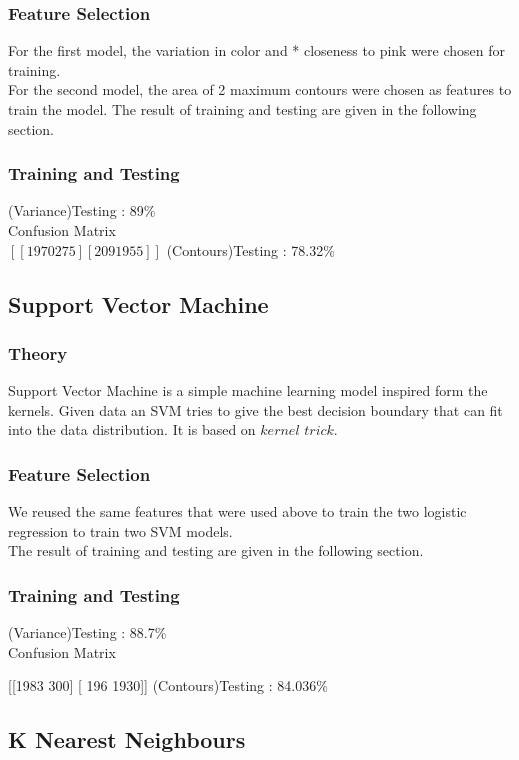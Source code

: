 \documentclass{scrreprt}
\begin{document}
\subsubsection{Feature Selection}
For the first model, the variation in color and * closeness to pink were chosen for training. \\
For the second model, the area of 2 maximum contours were chosen as features to train the model. 
The result of training and testing are given in the following section.

\subsubsection{Training and Testing}
(Variance)Testing : 89\%   \\
Confusion Matrix   \\
$	[[1970  275]
 	[ 209 1955]] $
(Contours)Testing : 78.32\%
	
\subsection{Support Vector Machine}
\subsubsection{Theory}
Support Vector Machine is a simple machine learning model inspired form the kernels. Given data an SVM tries to give the best decision boundary that can fit into the data distribution. It is based on $kernel$ $trick$.

\subsubsection{Feature Selection}
We reused the same features that were used above to train the two logistic regression to train two SVM models.\\
The result of training and testing are given in the following section.

\subsubsection{Training and Testing}
(Variance)Testing : 88.7\%   \\
		Confusion Matrix

		[[1983  300]
 		[ 196 1930]]
(Contours)Testing : 84.036\%
\subsection{K Nearest Neighbours}
\end{document}
